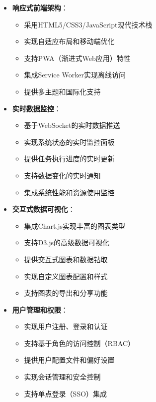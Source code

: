 \documentclass[12pt,a4paper]{article}
\begin{document}
\begin{itemize}
    \item \textbf{响应式前端架构}：
        \begin{itemize}
            \item 采用HTML5/CSS3/JavaScript现代技术栈
            \item 实现自适应布局和移动端优化
            \item 支持PWA（渐进式Web应用）特性
            \item 集成Service Worker实现离线访问
            \item 提供多主题和国际化支持
        \end{itemize}
    
    \item \textbf{实时数据监控}：
        \begin{itemize}
            \item 基于WebSocket的实时数据推送
            \item 实现系统状态的实时监控面板
            \item 提供任务执行进度的实时更新
            \item 支持数据变化的实时通知
            \item 集成系统性能和资源使用监控
        \end{itemize}
    
    \item \textbf{交互式数据可视化}：
        \begin{itemize}
            \item 集成Chart.js实现丰富的图表类型
            \item 支持D3.js的高级数据可视化
            \item 提供交互式图表和数据钻取
            \item 实现自定义图表配置和样式
            \item 支持图表的导出和分享功能
        \end{itemize}
    
    \item \textbf{用户管理和权限}：
        \begin{itemize}
            \item 实现用户注册、登录和认证
            \item 支持基于角色的访问控制（RBAC）
            \item 提供用户配置文件和偏好设置
            \item 实现会话管理和安全控制
            \item 支持单点登录（SSO）集成
        \end{itemize}
    

\end{itemize}
\end{document}
